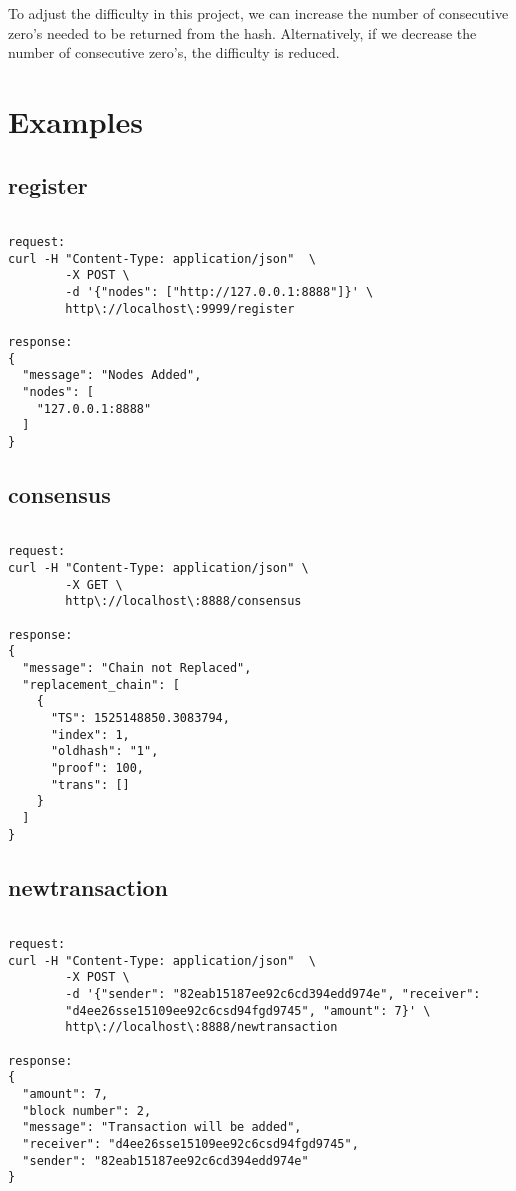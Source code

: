 To adjust the difficulty in this project, we can increase the number of consecutive zero's needed to be returned from the hash. Alternatively, if we decrease the number of consecutive zero's, the difficulty is reduced. 

\section{Examples}

\subsection{register}

\bigskip
\noindent
\begin{footnotesize}
\begin{verbatim}

request:
curl -H "Content-Type: application/json"  \
        -X POST \
        -d '{"nodes": ["http://127.0.0.1:8888"]}' \
        http\://localhost\:9999/register

response:
{
  "message": "Nodes Added",
  "nodes": [
    "127.0.0.1:8888"
  ]
}

\end{verbatim}
\end{footnotesize}

\subsection{consensus}

\bigskip
\noindent
\begin{footnotesize}
\begin{verbatim}

request:
curl -H "Content-Type: application/json" \
        -X GET \
        http\://localhost\:8888/consensus

response:
{
  "message": "Chain not Replaced",
  "replacement_chain": [
    {
      "TS": 1525148850.3083794,
      "index": 1,
      "oldhash": "1",
      "proof": 100,
      "trans": []
    }
  ]
}

\end{verbatim}
\end{footnotesize}

\subsection{newtransaction}

\bigskip
\noindent
\begin{footnotesize}
\begin{verbatim}

request:
curl -H "Content-Type: application/json"  \
        -X POST \
        -d '{"sender": "82eab15187ee92c6cd394edd974e", "receiver": 
        "d4ee26sse15109ee92c6csd94fgd9745", "amount": 7}' \
        http\://localhost\:8888/newtransaction

response:
{
  "amount": 7,
  "block number": 2,
  "message": "Transaction will be added",
  "receiver": "d4ee26sse15109ee92c6csd94fgd9745",
  "sender": "82eab15187ee92c6cd394edd974e"
}

\end{verbatim}
\end{footnotesize}


